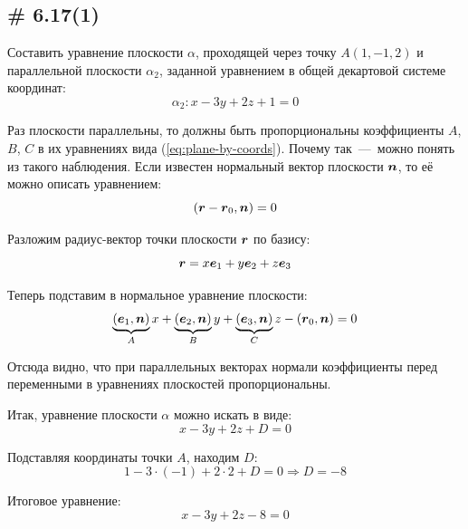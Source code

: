 \documentclass[a4paper,12pt]{article}
\begin{document}
  
  \subsection{\# 6.17(1)}
  
  \begin{problem}
    Составить уравнение плоскости $\alpha$, проходящей через точку $A(1, -1, 2)$ и параллельной плоскости $\alpha_2$, заданной уравнением в общей декартовой системе координат:
    \[
      \alpha_2\colon x - 3y + 2z + 1 = 0
    \]
  \end{problem}
  
  \begin{solution}
    Раз плоскости параллельны, то должны быть пропорциональны коэффициенты $A$, $B$, $C$ в их уравнениях вида (\ref{eq:plane-by-coords}).
    Почему так~---~можно понять из такого наблюдения.
    Если известен нормальный вектор плоскости $\boldsymbol n$, то её можно описать уравнением:
    \[
      (\boldsymbol r - \boldsymbol r_0, \boldsymbol n) = 0
    \]
    
    Разложим радиус-вектор точки плоскости $\boldsymbol r$ по базису:
    \[
      \boldsymbol r = x \boldsymbol e_1 + y \boldsymbol e_2 + z \boldsymbol e_3
    \]
    
    Теперь подставим в нормальное уравнение плоскости:
    \[
      \underbrace{(\boldsymbol e_1, \boldsymbol n)}_A x + \underbrace{(\boldsymbol e_2, \boldsymbol n)}_B y + \underbrace{(\boldsymbol e_3, \boldsymbol n)}_C z - (\boldsymbol r_0, \boldsymbol n) = 0
    \]
    
    Отсюда видно, что при параллельных векторах нормали коэффициенты перед переменными в уравнениях плоскостей пропорциональны.
    
    Итак, уравнение плоскости $\alpha$ можно искать в виде:
    \[
      x - 3y + 2z + D = 0
    \]
    
    Подставляя координаты точки $A$, находим $D$:
    \[
      1 - 3 \cdot (-1) + 2 \cdot 2 + D = 0 \Rightarrow D = -8
    \]
    
    Итоговое уравнение:
    \[
      x - 3y + 2z - 8 = 0
    \]
  \end{solution}
  
\end{document}
